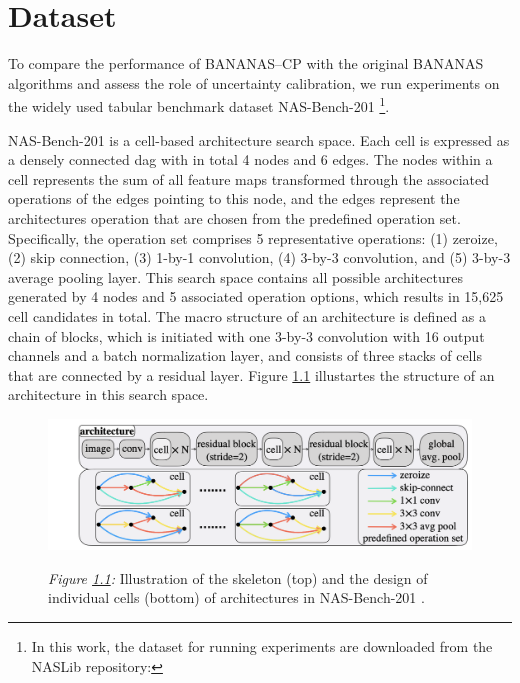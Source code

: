 \chapter{Dataset}
\label{ch: dataset}
To compare the performance of BANANAS--CP with the original BANANAS algorithms and assess the role of uncertainty calibration, we run experiments on the widely used tabular benchmark dataset NAS-Bench-201 \cite{dong2020nasbench201} \footnote{In this work, the dataset for running experiments are downloaded from the NASLib repository: }.

NAS-Bench-201 is a cell-based architecture search space. Each cell is expressed as a densely connected \gls{dag} with in total 4 nodes and 6 edges. The nodes within a cell represents the sum of all feature maps transformed through the associated operations of the edges pointing to this node, and the edges represent the architectures operation that are chosen from the predefined operation set. Specifically, the operation set comprises 5 representative operations: (1) zeroize, (2) skip connection, (3) 1-by-1 convolution, (4) 3-by-3 convolution, and (5) 3-by-3 average pooling layer. This search space contains all possible architectures generated by 4 nodes and 5 associated operation options, which results in 15,625 cell candidates in total. The macro structure of an architecture is defined as a chain of blocks, which is initiated with one 3-by-3 convolution with 16 output channels and a batch normalization layer, and consists of three stacks of cells that are connected by a residual layer. Figure \ref{fig: nasbench201} illustartes the structure of an architecture in this search space.  
 		
	\begin{figure}[bthp]
		\centering
		\includegraphics[scale=0.45]{figs/nas_bench_201.png}
		\label{fig: nasbench201}
			\parbox{\linewidth}{
	 		\vspace{0.5em}
 	 		{\small \textit{Figure \ref{fig: nasbench201}:} Illustration of the skeleton (top) and the design of individual cells (bottom) of architectures in NAS-Bench-201 \cite{dong2020nasbench201}.
 	 		}
 		}
		\end{figure}

